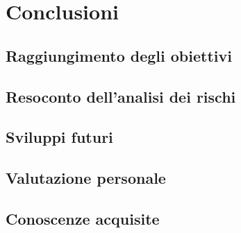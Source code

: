
\pagestyle{IHA-fancy-style}
\chapter{Conclusioni}
\label{cap:conclusioni}

\section{Raggiungimento degli obiettivi}
\label{sec:obiettivi-raggiunti}

\section{Resoconto dell'analisi dei rischi}

\section{Sviluppi futuri}

\section{Valutazione personale}

\section{Conoscenze acquisite}
